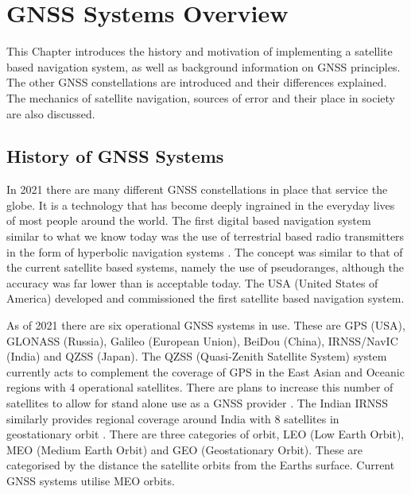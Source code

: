 
\chapter{GNSS Systems Overview} %

\label{Chapter2} %

This Chapter introduces the history and motivation of implementing a satellite based navigation system, as well as background information on GNSS principles. The other
GNSS constellations are introduced and their differences explained. The mechanics of satellite navigation, sources of error and their place in society are also discussed. 


\section{History of GNSS Systems} \label{sec:GNSSHistory}
In 2021 there are many different GNSS constellations in place that service the globe. It is a technology that has become deeply ingrained in the everyday lives of most
people around the world. The first digital based navigation system similar to what we know today was the use of terrestrial based radio transmitters in the form of
hyperbolic navigation systems \cite{RN68}. The concept was
similar to that of the current satellite based systems, namely the use of pseudoranges, although the accuracy was far lower than is acceptable today. The USA (United
States of America) developed
and commissioned the first satellite based navigation system.

As of 2021 there are six operational GNSS systems in use. These are GPS (USA), GLONASS (Russia), Galileo (European Union), BeiDou (China), IRNSS/NavIC (India) and QZSS (Japan). The
QZSS (Quasi-Zenith Satellite System) system currently acts to complement the coverage of GPS in the East Asian and Oceanic regions with 4 operational satellites. There are plans to increase this number
of satellites to allow for stand alone use as a GNSS provider \cite{RN47}. The Indian IRNSS similarly provides regional coverage around India with 8 satellites in
geostationary orbit \cite{RN55} . There are three categories of orbit, LEO (Low Earth Orbit), MEO (Medium Earth Orbit) and GEO (Geostationary Orbit). These are categorised by the distance the satellite orbits from the Earths surface.
Current GNSS systems utilise MEO orbits.

